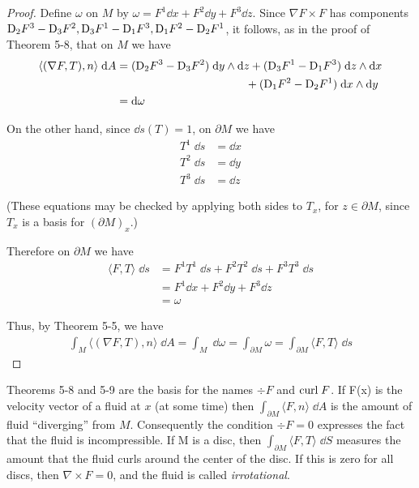 \begin{proof}
    Define $\omega$ on $M$ by $\omega=F^1\dd x + F^2\dd y + F^3\dd z$. Since $\nabla F\times F$ has 
    components $\mathrm{D}_2F^3 - \mathrm{D}_3F^2, \mathrm{D}_3F^1-\mathrm{D}_1F^3, \mathrm{D}_1F^2-\mathrm{D}_2F^1$, it follows,
    as in the proof of Theorem 5-8, that on $M$ we have 
    \begin{align*}
        \langle (\nabla F,T), n\rangle\;\dd A 
        & = (\R{D}_2F^3-\R{D}_3F^2)\;\dd y\wedge\dd z + (\R{D}_3F^1-\R{D}_1F^3)\;\dd z\wedge\dd x\\
        & \hspace*{11.4em} + (\R{D}_1F^2-\R{D}_2F^1)\;\dd x\wedge\dd y \\
        & = \dd\omega
    \end{align*}

    On the other hand, since $\dd s(T)=1$, on $\partial M$ we have 
    \begin{align*}
        T^1\;\dd s & = \dd x \\
        T^2\;\dd s & = \dd y \\
        T^3\;\dd s & = \dd z
    \end{align*}

    (These equations may be checked by applying both sides to $T_x$, 
    for $z\in\partial M$, since $T_x$ is a basis for $(\partial M)_x$.)

    Therefore on $\partial M$ we have
    \begin{align*}
        \langle F, T\rangle \;\dd s 
        & = F^1T^1\;\dd s + F^2T^2\;\dd s + F^3T^3\;\dd s \\
        & = F^1\dd x + F^2\dd y + F^3\dd z \\
        & = \omega
    \end{align*}

    Thus, by Theorem 5-5, we have 
    \begin{align*}
        \int_{M}\langle (\nabla F,T), n\rangle\;\dd A 
        = \int_{M}\;\dd\omega
        = \int_{\partial M}\omega
        = \int_{\partial M}\langle F,T\rangle\;\dd s
    \end{align*}
\end{proof}

Theorems 5-8 and 5-9 are the basis for the names $\div F$ and $\mathrm{curl}\; F$. If F(x) is the 
velocity vector of a fluid at $x$ (at some time) then $\int_{\partial M} \langle F,n\rangle\;\dd A$ 
is the amount of fluid ``diverging'' from $M$. Consequently the condition $\div F=0$ expresses
the fact that the fluid is incompressible. If M is a disc, then $\int_{\partial M} \langle F,T\rangle\;\dd S$
measures the amount that the fluid curls around the center of the disc. If this is zero for all discs, 
then $\nabla \times F=0$, and the fluid is called \textit{irrotational}.

